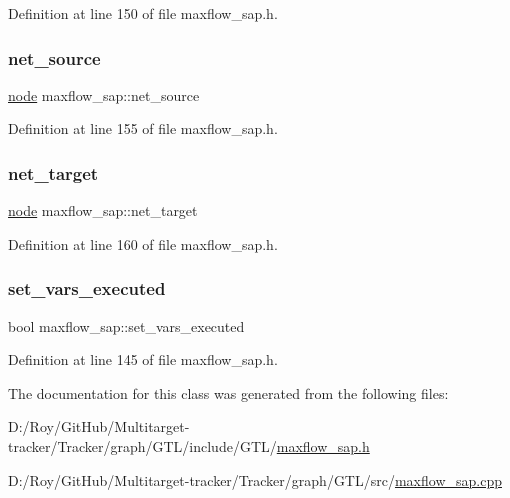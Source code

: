 Definition at line 150 of file maxflow\+\_\+sap.\+h.

\mbox{\label{classmaxflow__sap_abd4266c76dbd73f7f719d3a4fba2655d}} 
\subsubsection{\texorpdfstring{net\+\_\+source}{net\_source}}
{\footnotesize\ttfamily \mbox{\hyperlink{classnode}{node}} maxflow\+\_\+sap\+::net\+\_\+source\hspace{0.3cm}{\ttfamily [protected]}}



Definition at line 155 of file maxflow\+\_\+sap.\+h.

\mbox{\label{classmaxflow__sap_a8d0e8f448ed29a1329a70c8f4f496c2c}} 
\subsubsection{\texorpdfstring{net\+\_\+target}{net\_target}}
{\footnotesize\ttfamily \mbox{\hyperlink{classnode}{node}} maxflow\+\_\+sap\+::net\+\_\+target\hspace{0.3cm}{\ttfamily [protected]}}



Definition at line 160 of file maxflow\+\_\+sap.\+h.

\mbox{\label{classmaxflow__sap_aad7f764b9e9732b996f402ffadbf5b70}} 
\subsubsection{\texorpdfstring{set\+\_\+vars\+\_\+executed}{set\_vars\_executed}}
{\footnotesize\ttfamily bool maxflow\+\_\+sap\+::set\+\_\+vars\+\_\+executed\hspace{0.3cm}{\ttfamily [protected]}}



Definition at line 145 of file maxflow\+\_\+sap.\+h.



The documentation for this class was generated from the following files\+:\begin{DoxyCompactItemize}
\item 
D\+:/\+Roy/\+Git\+Hub/\+Multitarget-\/tracker/\+Tracker/graph/\+G\+T\+L/include/\+G\+T\+L/\mbox{\hyperlink{maxflow__sap_8h}{maxflow\+\_\+sap.\+h}}\item 
D\+:/\+Roy/\+Git\+Hub/\+Multitarget-\/tracker/\+Tracker/graph/\+G\+T\+L/src/\mbox{\hyperlink{maxflow__sap_8cpp}{maxflow\+\_\+sap.\+cpp}}\end{DoxyCompactItemize}
